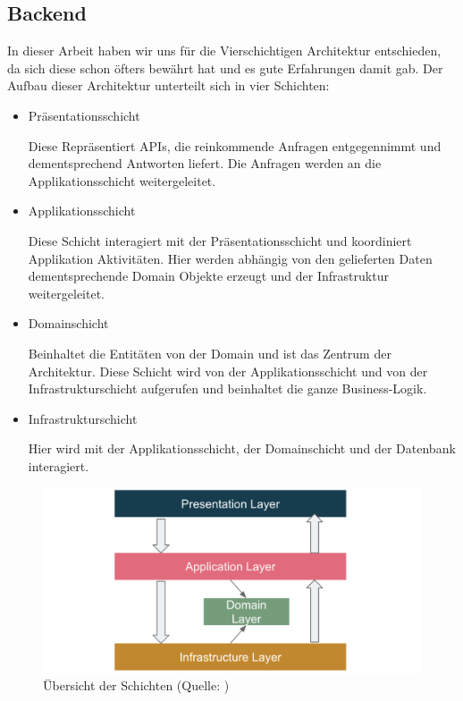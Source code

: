 \documentclass[a4paper, fontsize=11pt, parskip=half, twoside]{scrreprt}
\begin{document}
	\textcite{richards_fundamentals_2020}
	
	\subsection{Backend} \label{subsec:backend}
	In dieser Arbeit haben wir uns für die Vierschichtigen  Architektur entschieden, da sich diese schon öfters bewährt hat und es gute Erfahrungen damit gab.
	Der Aufbau dieser Architektur unterteilt sich in vier Schichten:
	
	\begin{itemize}
		\item Präsentationsschicht
		
		Diese Repräsentiert \ac{API}s, die reinkommende Anfragen entgegennimmt und dementsprechend Antworten liefert.
		Die Anfragen werden an die Applikationsschicht weitergeleitet.
		
		\item Applikationsschicht
		
		Diese Schicht interagiert mit der Präsentationsschicht und koordiniert Applikation Aktivitäten.
		Hier werden abhängig von den gelieferten Daten dementsprechende Domain Objekte erzeugt und der Infrastruktur weitergeleitet.
		
		\item Domainschicht
		
		Beinhaltet die Entitäten von der Domain und ist das Zentrum der Architektur.
		Diese Schicht wird von der Applikationsschicht und von der Infrastrukturschicht aufgerufen und beinhaltet die ganze Business-Logik.
		
		\item Infrastrukturschicht
		
		Hier wird mit der Applikationsschicht, der Domainschicht und der Datenbank interagiert.
	\end{itemize}

	\begin{figure}[ht]
		\centering
		\includegraphics[scale=0.5]{assets/layeredArchitecture.png}
		\caption{Übersicht der Schichten (Quelle: \textcite{zhang_domain_nodate})}
	\end{figure}
	
\end{document}
